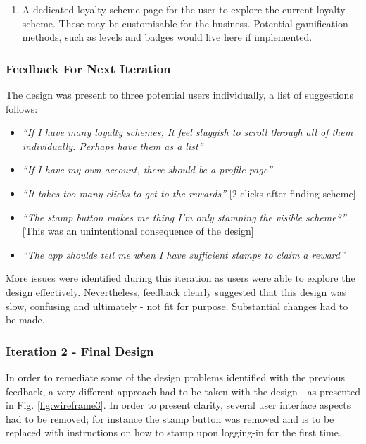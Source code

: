 \begin{enumerate}
  \item A dedicated loyalty scheme page for the user to explore the current loyalty scheme. These may be customisable for the business. Potential gamification methods, such as levels and badges would live here if implemented.
\end{enumerate}

\subsubsection{Feedback For Next Iteration}
The design was present to three potential users individually, a list of suggestions follows:
\begin{itemize}
  \item \textit{``If I have many loyalty schemes, It feel sluggish to scroll through all of them individually. Perhaps have them as a list''}
  \item \textit{``If I have my own account, there should be a profile page''}
  \item \textit{``It takes too many clicks to get to the rewards''} [2 clicks after finding scheme]
    \item \textit{``The stamp button makes me thing I'm only stamping the visible scheme?''} [This was an unintentional consequence of the design]
     \item \textit{``The app shoulds tell me when I have sufficient stamps to claim a reward''}
\end{itemize}

More issues were identified during this iteration as users were able to explore the design effectively. Nevertheless, feedback clearly suggested that this design was slow, confusing and ultimately - not fit for purpose. Substantial changes had to be made.

\subsubsection{Iteration 2 - Final Design}
In order to remediate some of the design problems identified with the previous feedback, a very different approach had to be taken with the design - as presented in Fig. \ref{fig:wireframe3}. In order to present clarity, several user interface aspects had to be removed; for instance the stamp button was removed and is to be replaced with instructions on how to stamp upon logging-in for the first time.

